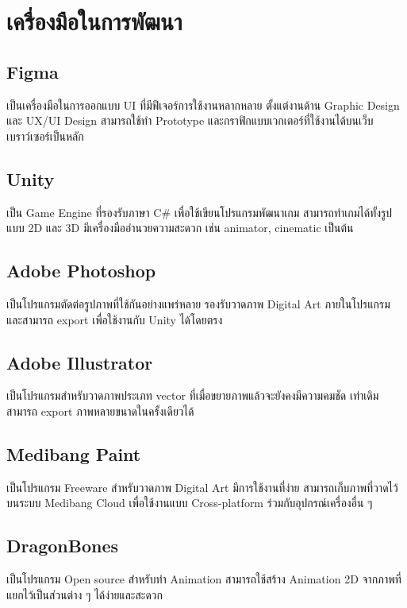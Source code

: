 \documentclass[12pt,oneside,openright,a4paper]{cpe-thai-project}
\begin{document}
\section{เครื่องมือในการพัฒนา}

\subsection{Figma}
เป็นเครื่องมือในการออกแบบ UI ที่มีฟีเจอร์การใช้งานหลากหลาย 
ตั้งแต่งานด้าน Graphic Design และ UX/UI Design สามารถใช้ทำ 
Prototype และกราฟิกแบบเวกเตอร์ที่ใช้งานได้บนเว็บเบราว์เซอร์เป็นหลัก 

\subsection{Unity}
เป็น Game Engine ที่รองรับภาษา C\# เพื่อใช้เขียนโปรแกรมพัฒนาเกม  
สามารถทำเกมได้ทั้งรูปแบบ 2D และ 3D มีเครื่องมืออำนวยความสะดวก 
เช่น animator, cinematic เป็นต้น

\subsection{Adobe Photoshop}
เป็นโปรแกรมตัดต่อรูปภาพที่ใช้กันอย่างแพร่หลาย รองรับวาดภาพ Digital Art 
ภายในโปรแกรม และสามารถ export เพื่อใช้งานกับ Unity ได้โดยตรง
 
\subsection{Adobe Illustrator}
เป็นโปรแกรมสำหรับวาดภาพประเภท vector ที่เมื่อขยายภาพแล้วจะยังคงมีความคมชัด
เท่าเดิม สามารถ export ภาพหลายขนาดในครั้งเดียวได้
 
\subsection{Medibang Paint} 
เป็นโปรแกรม Freeware สำหรับวาดภาพ Digital Art มีการใช้งานที่ง่าย 
สามารถเก็บภาพที่วาดไว้บนระบบ Medibang Cloud เพื่อใช้งานแบบ Cross-platform 
ร่วมกับอุปกรณ์เครื่องอื่น ๆ

\subsection{DragonBones} 
เป็นโปรแกรม Open source สำหรับทำ Animation 
สามารถใช้สร้าง Animation 2D จากภาพที่แยกไว้เป็นส่วนต่าง ๆ ได้ง่ายและสะดวก


\pagebreak
\end{document}
